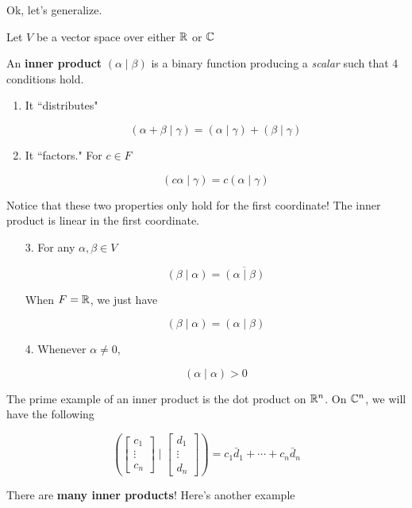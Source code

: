 \documentclass[12pt]{article}
\newcommand{\ip}[2]{\left( #1 \mid #2 \right)}
\begin{document}
  Ok, let's generalize.

  Let $V$ be a vector space over either ${\mathbb R}$ or ${\mathbb C}$

  \Definition{}
  {
    An {\bf inner product} $\ip{\alpha}{\beta}$ is a binary function producing a
    {\it scalar} such that 4 conditions hold.

    \begin{enumerate}
      \item It ``distributes"

        \[
          \ip{\alpha + \beta}{\gamma} = \ip{\alpha}{\gamma} + \ip{\beta}{\gamma}
        \]

      \item It ``factors." For $c \in F$

        \[
          \ip{c\alpha }{\gamma} = c\ip{\alpha}{\gamma}
        \]
    \end{enumerate}

    Notice that these two properties only hold for the first coordinate! The
    inner product is linear in the first coordinate.

    \begin{enumerate}
      \item[3.] For any $\alpha, \beta \in V$

        \[
          \ip{\beta}{\alpha} = \overline{\ip{\alpha}{\beta}}
        \]

        When $F = {\mathbb R}$, we just have

        \[
          \ip{\beta}{\alpha} = \ip{\alpha}{\beta}
        \]

      \item[4.] Whenever $\alpha \ne 0$,

        \[
          \ip{\alpha}{\alpha} > 0
        \]
    \end{enumerate}
  }

  The prime example of an inner product is the dot product on ${\mathbb R}^n$. On ${\mathbb C}^n$,
  we will have the following

  \[
    \ip{\begin{bmatrix} c_1 \\ \vdots \\ c_n \end{bmatrix}}{\begin{bmatrix} d_1
  \\ \vdots \\ d_n \end{bmatrix}} = c_1 \bar d_1 + \cdots + c_n \bar d_n
  \]

  There are {\bf many inner products}! Here's another example
\end{document}

